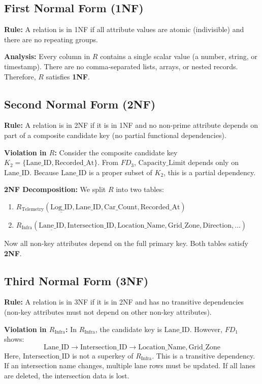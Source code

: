 \documentclass[11pt,a4paper]{article}
\begin{document}
\subsection{First Normal Form (1NF)}
\textbf{Rule:} A relation is in 1NF if all attribute values are atomic (indivisible) and there are no repeating groups.

\textbf{Analysis:} Every column in $R$ contains a single scalar value (a number, string, or timestamp). There are no comma-separated lists, arrays, or nested records. Therefore, $R$ satisfies \textbf{1NF}.

\subsection{Second Normal Form (2NF)}
\textbf{Rule:} A relation is in 2NF if it is in 1NF and no non-prime attribute depends on part of a composite candidate key (no partial functional dependencies).

\textbf{Violation in $R$:} Consider the composite candidate key $K_2 = \{\text{Lane\_ID}, \text{Recorded\_At}\}$. 
From $FD_3$, $\text{Capacity\_Limit}$ depends only on $\text{Lane\_ID}$. Because $\text{Lane\_ID}$ is a proper subset of $K_2$, this is a partial dependency.

\textbf{2NF Decomposition:} We split $R$ into two tables:
\begin{enumerate}
    \item $R_{\text{Telemetry}}(\underline{\text{Log\_ID}}, \text{Lane\_ID}, \text{Car\_Count}, \text{Recorded\_At})$
    \item $R_{\text{Infra}}(\underline{\text{Lane\_ID}}, \text{Intersection\_ID}, \text{Location\_Name}, \text{Grid\_Zone}, \text{Direction}, \dots)$
\end{enumerate}
Now all non-key attributes depend on the full primary key. Both tables satisfy \textbf{2NF}.

\subsection{Third Normal Form (3NF)}
\textbf{Rule:} A relation is in 3NF if it is in 2NF and has no transitive dependencies (non-key attributes must not depend on other non-key attributes).

\textbf{Violation in $R_{\text{Infra}}$:} In $R_{\text{Infra}}$, the candidate key is $\text{Lane\_ID}$. 
However, $FD_1$ shows:
$$\text{Lane\_ID} \rightarrow \text{Intersection\_ID} \rightarrow \text{Location\_Name}, \text{Grid\_Zone}$$
Here, $\text{Intersection\_ID}$ is not a superkey of $R_{\text{Infra}}$. This is a transitive dependency. If an intersection name changes, multiple lane rows must be updated. If all lanes are deleted, the intersection data is lost.
\end{document}
